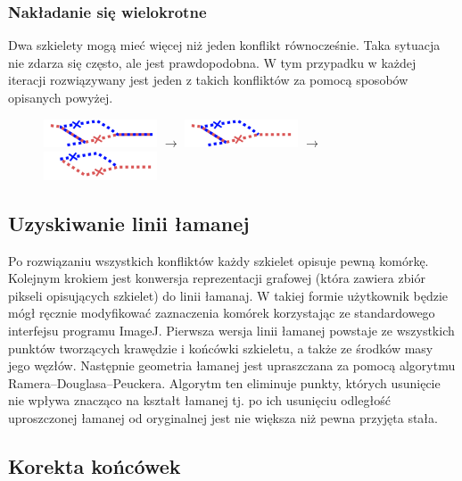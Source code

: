 \documentclass[declaration,shortabstract,mgr]{iithesis}
\begin{document}
\subsubsection{Nakładanie się wielokrotne}

Dwa szkielety mogą mieć więcej niż jeden konflikt równocześnie.
Taka sytuacja nie zdarza się często, ale jest prawdopodobna.
W tym przypadku w każdej iteracji rozwiązywany jest jeden z takich konfliktów za pomocą sposobów opisanych powyżej.

\begin{figure}[H]
  \centering
  \includegraphics[valign=m,width=0.3\textwidth]{images/overlap-multi.png}
  $\rightarrow$
  \includegraphics[valign=m,width=0.3\textwidth]{images/overlap-multi-solved1.png}
  $\rightarrow$
  \includegraphics[valign=m,width=0.3\textwidth]{images/overlap-multi-solved2.png}
\end{figure}

\subsection{Uzyskiwanie linii łamanej}

Po rozwiązaniu wszystkich konfliktów każdy szkielet opisuje pewną komórkę.
Kolejnym krokiem jest konwersja reprezentacji grafowej (która zawiera zbiór pikseli opisujących szkielet) do linii łamanaj.
W takiej formie użytkownik będzie mógł ręcznie modyfikować zaznaczenia komórek korzystając ze standardowego interfejsu programu ImageJ.
Pierwsza wersja linii łamanej powstaje ze wszystkich punktów tworzących krawędzie i końcówki szkieletu, a także ze środków masy jego węzłów.
Następnie geometria łamanej jest upraszczana za pomocą algorytmu Ramera--Douglasa--Peuckera\cite{algo:ramer}\cite{algo:douglas-peucker}.
Algorytm ten eliminuje punkty, których usunięcie nie wpływa znacząco na kształt łamanej tj. po ich usunięciu odległość uproszczonej łamanej od oryginalnej jest nie większa niż pewna przyjęta stała.

\subsection{Korekta końcówek}
\label{sec:correct-endpoints}
\end{document}
